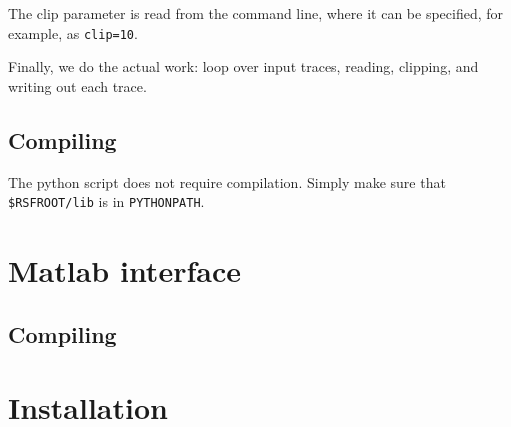 
The clip parameter is read from the command line, where it can be specified,
for example, as \texttt{clip=10}.


Finally, we do the actual work: loop over input traces, reading, clipping, and
writing out each trace.

\subsection{Compiling}

The python script does not require compilation. Simply make sure that
\texttt{\$RSFROOT/lib} is in \texttt{PYTHONPATH}. 

\section{Matlab interface}

\subsection{Compiling}

\section{Installation} 




